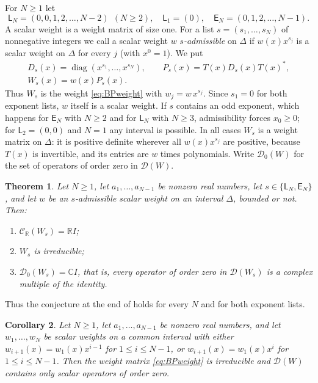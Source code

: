 \documentclass[11pt]{amsart}
\newtheorem{theorem}{Theorem}[section]
\newtheorem{corollary}[theorem]{Corollary}
\theoremstyle{definition}
\theoremstyle{remark}
\numberwithin{equation}{section}
\newcommand{\C}{\mathbb{C}}
\newcommand{\R}{\mathbb{R}}
\newcommand{\diag}{\operatorname{diag}}
\newcommand{\cD}{\mathcal{D}}
\newcommand{\CR}{\mathcal{C}_{\R}}
\newcommand{\sL}{\mathsf{L}}
\newcommand{\sE}{\mathsf{E}}
\begin{document}
For $N\ge1$ let
\[
\sL_N=(0,0,1,2,\dots,N-2)\ \ (N\ge2),\quad \sL_1=(0),\quad
\sE_N=(0,1,2,\dots,N-1).
\]
A scalar weight is a weight matrix of size one. For a list
$s=(s_1,\dots,s_N)$ of nonnegative integers we call a scalar weight $w$
\emph{$s$-admissible} on $\Delta$ if $w(x)x^{s_j}$ is a scalar weight on
$\Delta$ for every $j$ (with $x^0=1$). We put
\begin{equation}\label{eq:Ws}
\begin{gathered}
D_s(x)=\diag(x^{s_1},\dots,x^{s_N}),\qquad P_s(x)=T(x)D_s(x)T(x)^*,\\
W_s(x)=w(x)P_s(x).
\end{gathered}
\end{equation}
Thus $W_s$ is the weight \eqref{eq:BPweight} with $w_j=w\,x^{s_j}$. Since
$s_1=0$ for both exponent lists, $w$ itself is a scalar weight. If $s$ contains an odd
exponent, which happens for $\sE_N$ with $N\ge2$ and for $\sL_N$ with
$N\ge3$, admissibility forces $x_0\ge0$; for $\sL_2=(0,0)$ and $N=1$ any
interval is possible. In all cases $W_s$ is a weight matrix on $\Delta$:
it is positive definite wherever all $w(x)x^{s_j}$ are positive, because
$T(x)$ is invertible, and its entries are $w$ times polynomials. Write
$\cD_0(W)$ for the set of operators of order zero in $\cD(W)$.

\begin{theorem}\label{thm:main}
Let $N\ge1$, let $a_1,\dots,a_{N-1}$ be nonzero real numbers, let
$s\in\{\sL_N,\sE_N\}$, and let $w$ be an $s$-admissible scalar weight on an
interval $\Delta$, bounded or not. Then:
\begin{enumerate}
\item[(a)] $\CR(W_s)=\R I$;
\item[(b)] $W_s$ is irreducible;
\item[(c)] $\cD_0(W_s)=\C I$, that is, every operator of order zero in
$\cD(W_s)$ is a complex multiple of the identity.
\end{enumerate}
\end{theorem}

Thus the conjecture at the end of \cite[Section~5]{BP26} holds for every
$N$ and for both exponent lists.

\begin{corollary}\label{cor:conjecture}
Let $N\ge1$, let $a_1,\dots,a_{N-1}$ be nonzero real numbers, and let
$w_1,\dots,w_N$ be scalar weights on a common interval with either $w_{i+1}(x)=w_1(x)x^{i-1}$ for $1\le i\le N-1$, or
$w_{i+1}(x)=w_1(x)x^{i}$ for $1\le i\le N-1$. Then the weight matrix
\eqref{eq:BPweight} is irreducible and $\cD(W)$ contains only scalar
operators of order zero.
\end{corollary}
\end{document}
